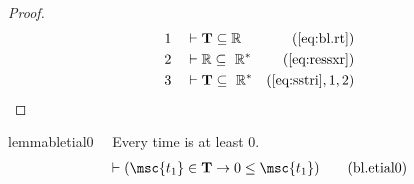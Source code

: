 \begin{proof}
\begin{align}
  1 &&  & \vdash \mathbf{T} \subseteq \mathbb{R}&(\mbox{\ref{eq:bl.rt}})\notag
  \\ 2 &&  & \vdash \mathbb{R} \subseteq
     ~\mathbb{R}^{*}&(\mbox{\ref{eq:ressxr}})\notag
  \\ 3 &&  & \vdash \mathbf{T} \subseteq
     ~\mathbb{R}^{*}&(\mbox{\ref{eq:sstri}},1,2)\notag
\end{align}
\end{proof}

\begin{restatable}{lemma}{bletial0}~~ Every time is at least 0.
\begin{align}
\vdash ( \msc{t_1} \in \mathbf{T} \rightarrow 0 \le \msc{t_1}
    )\label{eq:bl.etial0}\tag{bl.etial0}
\end{align}
\end{restatable}

